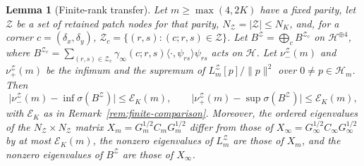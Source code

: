 \documentclass[preprint,12pt,a4paper]{elsarticle}
\newtheorem{lemma}[theorem]{Lemma}
\theoremstyle{remark}
\begin{document}
\begin{lemma}[Finite-rank transfer]\label{lem:finite-rank}
Let $m\ge\max(4,2K)$ have a fixed parity, let $\mathcal Z$ be a set of retained patch
nodes for that parity, $N_{\mathcal Z}=|\mathcal Z|\le N_K$, and, for a corner
$c=(\delta_x,\delta_y)$, $\mathcal Z_{c}=\{(r,s):(c;r,s)\in\mathcal Z\}$. Let
$B^{\mathcal Z}=\bigoplus_cB^{\mathcal Z_c}$ on $\mathcal H^{\oplus4}$, where
$B^{\mathcal Z_c}=\sum_{(r,s)\in\mathcal Z_c}\gamma_\infty(c;r,s)\langle\cdot,\psi_{rs}\rangle\psi_{rs}$
acts on $\mathcal H$. Let $\nu^{\mathcal Z}_-(m)$ and $\nu^{\mathcal Z}_+(m)$ be the
infimum and the supremum of $L^{\mathcal Z}_m[p]/\|p\|^2$ over $0\ne p\in\mathcal H_m$. Then
\[
 \bigl|\nu^{\mathcal Z}_-(m)-\inf\sigma(B^{\mathcal Z})\bigr|\le \mathcal E_K(m),\qquad
 \bigl|\nu^{\mathcal Z}_+(m)-\sup\sigma(B^{\mathcal Z})\bigr|\le \mathcal E_K(m),
\]
with $\mathcal E_K$ as in Remark~\ref{rem:finite-comparison}. Moreover, the ordered
eigenvalues of the $N_{\mathcal Z}\times N_{\mathcal Z}$ matrix $X_m=G_m^{1/2}C_mG_m^{1/2}$ differ from
those of $X_\infty=G_\infty^{1/2}C_\infty G_\infty^{1/2}$ by at most $\mathcal E_K(m)$,
the nonzero eigenvalues of $L_m^{\mathcal Z}$ are those of $X_m$, and the nonzero
eigenvalues of $B^{\mathcal Z}$ are those of $X_\infty$.
\end{lemma}
\end{document}
